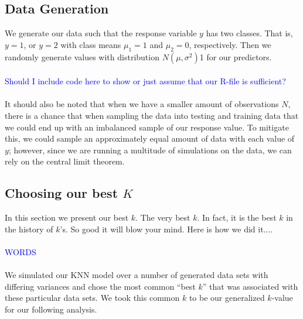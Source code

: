 \documentclass[11pt, oneside]{article}
\begin{document}
\subsection*{Data Generation} 
We generate our data such that the response variable $y$ has two classes. That is, $y=1$, or $y=2$ with class means $\mu_1=1$ and $\mu_2=0$, respectively. Then we randomly generate values with distribution $N(\mu, \sigma^2)$1 for our predictors.\\
\\
\textcolor{blue}{Should I include code here to show or just assume that our R-file is sufficient?}\\
\\
It should also be noted that when we have a smaller amount of observations $N$, there is a chance that when sampling the data into testing and training data that we could end up with an imbalanced sample of our response value. To mitigate this, we could sample an approximately equal amount of data with each value of $y$; however, since we are running a multitude of simulations on the data, we can rely on the central limit theorem.\\ 


\subsection*{Choosing our best $K$}
In this section we present our best $k$. The very best $k$. In fact, it is the best $k$ in the history of $k$'s. So good it will blow your mind. Here is how we did it....\\
\\
\textcolor{blue}{WORDS}\\
\\

We simulated our KNN model over a number of generated data sets with differing variances and chose the most common ``best $k$'' that was associated with these particular data sets. We took this common $k$ to be our generalized $k$-value for our following analysis.\\
\\
\end{document}
